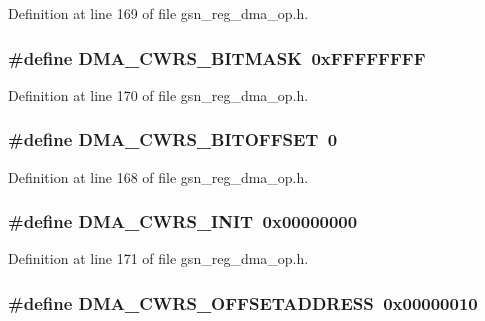 Definition at line 169 of file gsn\_\-reg\_\-dma\_\-op.h.

\hypertarget{a00547_a5e80fdf1891b59ecb90195e590e9e9ce}{
\subsubsection[{DMA\_\-CWRS\_\-BITMASK}]{\setlength{\rightskip}{0pt plus 5cm}\#define DMA\_\-CWRS\_\-BITMASK~0xFFFFFFFF}}
\label{a00547_a5e80fdf1891b59ecb90195e590e9e9ce}


Definition at line 170 of file gsn\_\-reg\_\-dma\_\-op.h.

\hypertarget{a00547_ad84e190579dc1c15d699d2c8ffed4697}{
\subsubsection[{DMA\_\-CWRS\_\-BITOFFSET}]{\setlength{\rightskip}{0pt plus 5cm}\#define DMA\_\-CWRS\_\-BITOFFSET~0}}
\label{a00547_ad84e190579dc1c15d699d2c8ffed4697}


Definition at line 168 of file gsn\_\-reg\_\-dma\_\-op.h.

\hypertarget{a00547_aada4a90fe97149be3cb8edf32137cd5b}{
\subsubsection[{DMA\_\-CWRS\_\-INIT}]{\setlength{\rightskip}{0pt plus 5cm}\#define DMA\_\-CWRS\_\-INIT~0x00000000}}
\label{a00547_aada4a90fe97149be3cb8edf32137cd5b}


Definition at line 171 of file gsn\_\-reg\_\-dma\_\-op.h.

\hypertarget{a00547_a88cc8dbd632d8174697ce8a77e166671}{
\subsubsection[{DMA\_\-CWRS\_\-OFFSETADDRESS}]{\setlength{\rightskip}{0pt plus 5cm}\#define DMA\_\-CWRS\_\-OFFSETADDRESS~0x00000010}}
\label{a00547_a88cc8dbd632d8174697ce8a77e166671}


